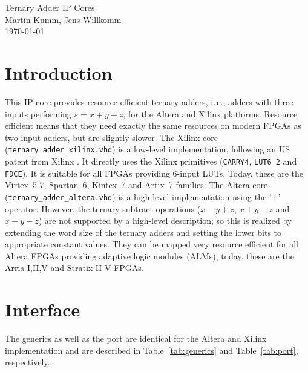 \documentclass[a4paper,BCOR7mm,12pt,pointlessnumbers,bibtotoc]{scrartcl}
\begin{document}
\begin{center}
\Large Ternary Adder IP Cores\\[0.4cm]
\large Martin Kumm, Jens Willkomm \\[0.5cm]
\large \today \\[0.5cm]
\end{center}

\section{Introduction}

This IP core provides resource efficient ternary adders, i.\,e., adders with three inputs performing $s = x + y + z$, for the Altera and Xilinx platforms. 
Resource efficient means that they need exactly the same resources on modern FPGAs as two-input adders, but are slightly slower.
The Xilinx core (\verb|ternary_adder_xilinx.vhd|) is a low-level implementation, following an US patent from Xilinx \cite{sp07}. It directly uses the Xilinx primitives (\verb|CARRY4|, \verb|LUT6_2| and \verb|FDCE|). It is suitable for all FPGAs providing 6-input LUTs. Today, these are the Virtex~5-7, Spartan~6, Kintex~7 and Artix~7 families. The Altera core (\verb|ternary_adder_altera.vhd|) is a high-level implementation using the '+' operator. However, the ternary subtract operations ($x - y + z$, $x + y - z$ and $x - y - z$) are not supported by a high-level description; so this is realized by extending the word size of the ternary adders and setting the lower bits to appropriate constant values. 
They can be mapped very resource efficient for all Altera FPGAs providing adaptive logic modules (ALMs), today, these are the Arria I,II,V and Stratix II-V FPGAs.

\section{Interface}

The generics as well as the port are identical for the Altera and Xilinx implementation and are described in Table~\ref{tab:generics} and Table~\ref{tab:port}, respectively.
\end{document}
